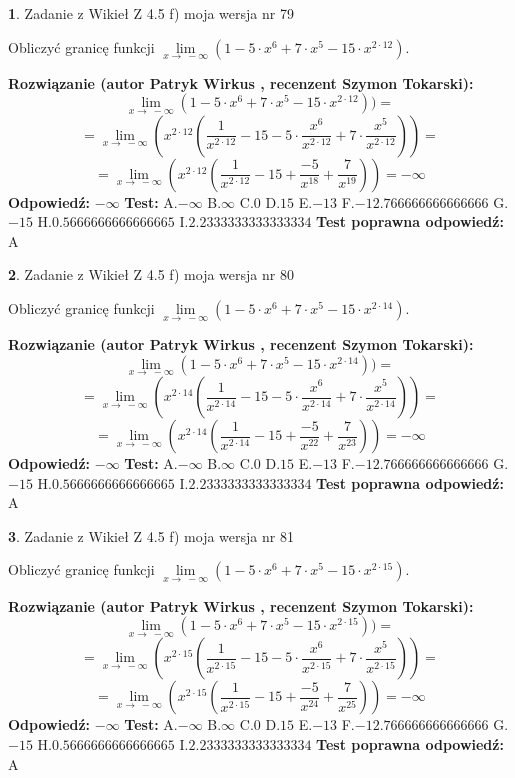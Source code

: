 \documentclass[12pt, a4paper]{article}
\theoremstyle{definition} %
\newtheorem{zad}{}
\newcommand{\zadStart}[1]{\begin{zad}#1\newline}
\newcommand{\zadStop}{\end{zad}}
\newcommand{\rozwStart}[2]{\noindent \textbf{Rozwiązanie (autor #1 , recenzent #2): }\newline}
\newcommand{\rozwStop}{\newline}
\newcommand{\odpStart}{\noindent \textbf{Odpowiedź:}\newline}
\newcommand{\odpStop}{\newline}
\newcommand{\testStart}{\noindent \textbf{Test:}\newline}
\newcommand{\testStop}{\newline}
\newcommand{\kluczStart}{\noindent \textbf{Test poprawna odpowiedź:}\newline}
\newcommand{\kluczStop}{\newline}
\begin{document}
\zadStart{Zadanie z Wikieł Z 4.5 f) moja wersja nr 79}


Obliczyć granicę funkcji  $\lim\limits_{x\to\ -\infty}(1 - 5 \cdot x^{6}+7 \cdot x^{5}- 15 \cdot x^{2\cdot12})$.
\zadStop
\rozwStart{Patryk Wirkus}{Szymon Tokarski}
$$\lim\limits_{x\to\ -\infty}(1 - 5 \cdot x^{6}+7 \cdot x^{5}- 15 \cdot x^{2\cdot12}))=$$
$$=\lim\limits_{x\to\ -\infty}(x^{2\cdot12}(\frac{1}{x^{2\cdot12}}-15 -5 \cdot \frac{x^{6}}{x^{2\cdot12}}+7 \cdot \frac{x^{5}}{x^{2\cdot12}}))=$$
$$=\lim\limits_{x\to\ -\infty}(x^{2\cdot12}(\frac{1}{x^{2\cdot12}}-15 + \frac{-5}{x^{18}}+ \frac{7}{x^{19}}))=-\infty$$
\rozwStop
\odpStart
$-\infty$
\odpStop
\testStart
A.$-\infty$ B.$\infty$ C.$0$ D.$15$ E.$-13$
F.$-12.766666666666666$ G.$-15$
H.$0.5666666666666665$
I.$2.2333333333333334$
\testStop
\kluczStart
A
\kluczStop



\zadStart{Zadanie z Wikieł Z 4.5 f) moja wersja nr 80}


Obliczyć granicę funkcji  $\lim\limits_{x\to\ -\infty}(1 - 5 \cdot x^{6}+7 \cdot x^{5}- 15 \cdot x^{2\cdot14})$.
\zadStop
\rozwStart{Patryk Wirkus}{Szymon Tokarski}
$$\lim\limits_{x\to\ -\infty}(1 - 5 \cdot x^{6}+7 \cdot x^{5}- 15 \cdot x^{2\cdot14}))=$$
$$=\lim\limits_{x\to\ -\infty}(x^{2\cdot14}(\frac{1}{x^{2\cdot14}}-15 -5 \cdot \frac{x^{6}}{x^{2\cdot14}}+7 \cdot \frac{x^{5}}{x^{2\cdot14}}))=$$
$$=\lim\limits_{x\to\ -\infty}(x^{2\cdot14}(\frac{1}{x^{2\cdot14}}-15 + \frac{-5}{x^{22}}+ \frac{7}{x^{23}}))=-\infty$$
\rozwStop
\odpStart
$-\infty$
\odpStop
\testStart
A.$-\infty$ B.$\infty$ C.$0$ D.$15$ E.$-13$
F.$-12.766666666666666$ G.$-15$
H.$0.5666666666666665$
I.$2.2333333333333334$
\testStop
\kluczStart
A
\kluczStop



\zadStart{Zadanie z Wikieł Z 4.5 f) moja wersja nr 81}


Obliczyć granicę funkcji  $\lim\limits_{x\to\ -\infty}(1 - 5 \cdot x^{6}+7 \cdot x^{5}- 15 \cdot x^{2\cdot15})$.
\zadStop
\rozwStart{Patryk Wirkus}{Szymon Tokarski}
$$\lim\limits_{x\to\ -\infty}(1 - 5 \cdot x^{6}+7 \cdot x^{5}- 15 \cdot x^{2\cdot15}))=$$
$$=\lim\limits_{x\to\ -\infty}(x^{2\cdot15}(\frac{1}{x^{2\cdot15}}-15 -5 \cdot \frac{x^{6}}{x^{2\cdot15}}+7 \cdot \frac{x^{5}}{x^{2\cdot15}}))=$$
$$=\lim\limits_{x\to\ -\infty}(x^{2\cdot15}(\frac{1}{x^{2\cdot15}}-15 + \frac{-5}{x^{24}}+ \frac{7}{x^{25}}))=-\infty$$
\rozwStop
\odpStart
$-\infty$
\odpStop
\testStart
A.$-\infty$ B.$\infty$ C.$0$ D.$15$ E.$-13$
F.$-12.766666666666666$ G.$-15$
H.$0.5666666666666665$
I.$2.2333333333333334$
\testStop
\kluczStart
A
\kluczStop
\end{document}
